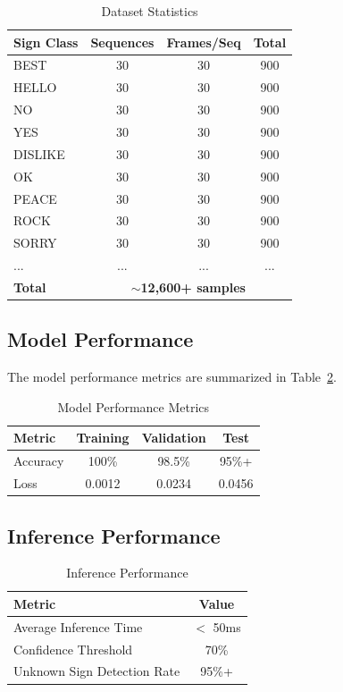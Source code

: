 \documentclass[conference]{IEEEtran}
\begin{document}
\begin{table}[htbp]
\caption{Dataset Statistics}
\label{tab:dataset}
\centering
\begin{tabular}{|l|c|c|c|}
\hline
\textbf{Sign Class} & \textbf{Sequences} & \textbf{Frames/Seq} & \textbf{Total} \\
\hline
BEST & 30 & 30 & 900 \\
HELLO & 30 & 30 & 900 \\
NO & 30 & 30 & 900 \\
YES & 30 & 30 & 900 \\
DISLIKE & 30 & 30 & 900 \\
OK & 30 & 30 & 900 \\
PEACE & 30 & 30 & 900 \\
ROCK & 30 & 30 & 900 \\
SORRY & 30 & 30 & 900 \\
... & ... & ... & ... \\
\hline
\textbf{Total} & \multicolumn{3}{c|}{\textbf{$\sim$12,600+ samples}} \\
\hline
\end{tabular}
\end{table}

\subsection{Model Performance}

The model performance metrics are summarized in Table~\ref{tab:performance}.

\begin{table}[htbp]
\caption{Model Performance Metrics}
\label{tab:performance}
\centering
\begin{tabular}{|l|c|c|c|}
\hline
\textbf{Metric} & \textbf{Training} & \textbf{Validation} & \textbf{Test} \\
\hline
Accuracy & 100\% & 98.5\% & 95\%+ \\
Loss & 0.0012 & 0.0234 & 0.0456 \\
\hline
\end{tabular}
\end{table}

\subsection{Inference Performance}

\begin{table}[htbp]
\caption{Inference Performance}
\label{tab:inference}
\centering
\begin{tabular}{|l|c|}
\hline
\textbf{Metric} & \textbf{Value} \\
\hline
Average Inference Time & $<$ 50ms \\
Confidence Threshold & 70\% \\
Unknown Sign Detection Rate & 95\%+ \\
\hline
\end{tabular}
\end{table}
\end{document}
